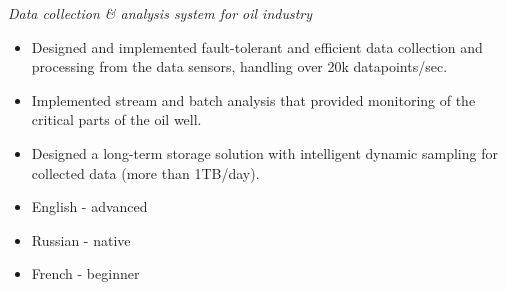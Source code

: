 \documentclass[10pt,a4paper,ragged2e,withhyper]{altacv}
\begin{document}
\begin{paracol}{2}
\divider


\textit{Data collection \& analysis system for oil industry}

\begin{itemize}
  \item Designed and implemented fault-tolerant and efficient data collection and processing from the data sensors, handling over 20k datapoints/sec.
  \item Implemented stream and batch analysis that provided monitoring of the critical parts of the oil well.
  \item Designed a long-term storage solution with intelligent dynamic sampling for collected data (more than 1TB/day).
\end{itemize}

\divider


\switchcolumn







\medskip



\medskip





\begin{itemize}
\item English - advanced
\item Russian - native
\item French - beginner
\end{itemize}


\end{paracol}
\end{document}
